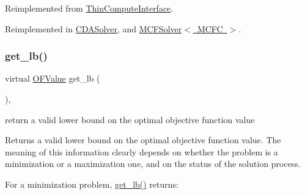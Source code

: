 Reimplemented from \mbox{\hyperlink{class_s_m_spp__di__unipi__it_1_1_thin_compute_interface_aee367363e42f86be5376165878f958f5}{Thin\+Compute\+Interface}}.



Reimplemented in \mbox{\hyperlink{class_s_m_spp__di__unipi__it_1_1_c_d_a_solver_a75dd1491b74c4b9476755e061dce3e04}{C\+D\+A\+Solver}}, and \mbox{\hyperlink{class_s_m_spp__di__unipi__it_1_1_m_c_f_solver_a75dd1491b74c4b9476755e061dce3e04}{M\+C\+F\+Solver$<$ M\+C\+F\+C $>$}}.

\mbox{\label{class_s_m_spp__di__unipi__it_1_1_solver_a4a4dbe4c2416d531c4619ca94fc07d31}} 
\subsubsection{\texorpdfstring{get\+\_\+lb()}{get\_lb()}}
{\footnotesize\ttfamily virtual \mbox{\hyperlink{class_s_m_spp__di__unipi__it_1_1_solver_ab8ce6bff9c21fdcd41e355167209301a}{O\+F\+Value}} get\+\_\+lb (\begin{DoxyParamCaption}\item[{void}]{ }\end{DoxyParamCaption})\hspace{0.3cm}{\ttfamily [inline]}, {\ttfamily [virtual]}}



return a valid lower bound on the optimal objective function value 

Returns a valid lower bound on the optimal objective function value. The meaning of this information clearly depends on whether the problem is a minimization or a maximization one, and on the status of the solution process.

For a minimization problem, \mbox{\hyperlink{class_s_m_spp__di__unipi__it_1_1_solver_a4a4dbe4c2416d531c4619ca94fc07d31}{get\+\_\+lb()}} returns\+:


